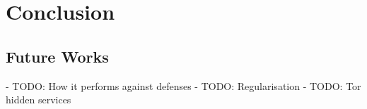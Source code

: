 \section{Conclusion}

\subsection{Future Works}
- TODO: How it performs against defenses
- TODO: Regularisation
- TODO: Tor hidden services
